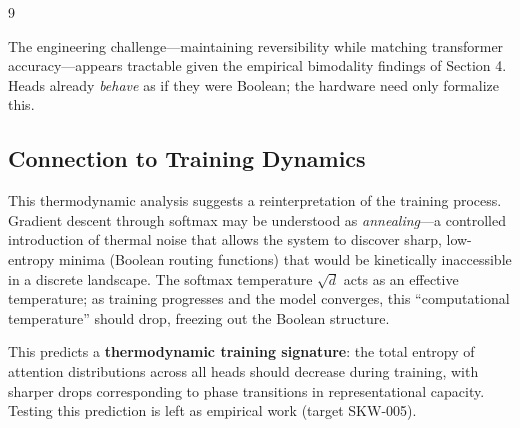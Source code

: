 \documentclass[11pt]{article}
\theoremstyle{definition}
\begin{document}
\begin{thebibliography}{9}
{{{The engineering challenge—maintaining reversibility while matching transformer accuracy—appears tractable given the empirical bimodality findings of Section 4. Heads already \emph{behave} as if they were Boolean; the hardware need only formalize this.













\subsection{Connection to Training Dynamics}













This thermodynamic analysis suggests a reinterpretation of the training process. Gradient descent through softmax may be understood as \emph{annealing}—a controlled introduction of thermal noise that allows the system to discover sharp, low-entropy minima (Boolean routing functions) that would be kinetically inaccessible in a discrete landscape. The softmax temperature $\sqrt{d}$ acts as an effective temperature; as training progresses and the model converges, this ``computational temperature'' should drop, freezing out the Boolean structure.













This predicts a \textbf{thermodynamic training signature}: the total entropy of attention distributions across all heads should decrease during training, with sharper drops corresponding to phase transitions in representational capacity. Testing this prediction is left as empirical work (target SKW-005).



















}}}
\end{thebibliography}
\end{document}

